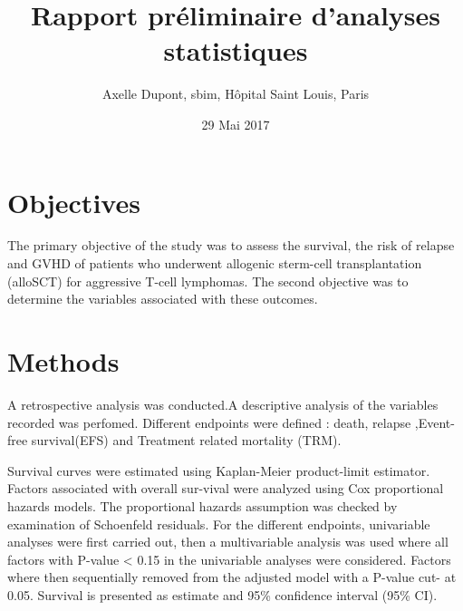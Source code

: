 \documentclass[a4paper,11pt] {article}
\begin{document}
\title{ Rapport préliminaire d'analyses statistiques}
\author{Axelle Dupont, sbim, Hôpital Saint Louis, Paris}
\date{29 Mai 2017}









\maketitle

\tableofcontents
\pagebreak[4]
\listoftables
\listoffigures


\pagebreak[4]

\section{Objectives}

The primary objective of the study was to assess the survival, the risk of relapse and GVHD  of patients who underwent allogenic sterm-cell transplantation (alloSCT) for aggressive T-cell lymphomas. 
The second objective was to determine the variables associated with these outcomes.

\section{Methods}

A  retrospective analysis was conducted.A descriptive analysis of the variables recorded was perfomed. Different endpoints were defined : death, relapse ,Event-free survival(EFS) and Treatment related mortality (TRM).

Survival curves were estimated using Kaplan-Meier product-limit estimator. Factors associated with overall sur-vival were analyzed using Cox proportional hazards models. The proportional hazards assumption was checked by examination of Schoenfeld residuals.
For the different endpoints, univariable analyses were first carried out, then a multivariable analysis was used where all factors with P-value < 0.15 in the univariable analyses were considered. Factors where then sequentially removed from the adjusted model with a P-value cut- at 0.05. 
Survival is presented as estimate and 95\% confidence interval (95\% CI).
\end{document}
